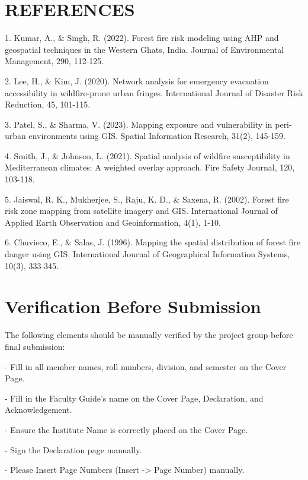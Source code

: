 \documentclass[12pt,a4paper]{article}
\begin{document}
\clearpage
\section*{REFERENCES}

1. Kumar, A., \& Singh, R. (2022). Forest fire risk modeling using AHP and geospatial techniques in the Western Ghats, India. Journal of Environmental Management, 290, 112-125.


2. Lee, H., \& Kim, J. (2020). Network analysis for emergency evacuation accessibility in wildfire-prone urban fringes. International Journal of Disaster Risk Reduction, 45, 101-115.


3. Patel, S., \& Sharma, V. (2023). Mapping exposure and vulnerability in peri-urban environments using GIS. Spatial Information Research, 31(2), 145-159.


4. Smith, J., \& Johnson, L. (2021). Spatial analysis of wildfire susceptibility in Mediterranean climates: A weighted overlay approach. Fire Safety Journal, 120, 103-118.


5. Jaiswal, R. K., Mukherjee, S., Raju, K. D., \& Saxena, R. (2002). Forest fire risk zone mapping from satellite imagery and GIS. International Journal of Applied Earth Observation and Geoinformation, 4(1), 1-10.


6. Chuvieco, E., \& Salas, J. (1996). Mapping the spatial distribution of forest fire danger using GIS. International Journal of Geographical Information Systems, 10(3), 333-345.



\section*{Verification Before Submission}

The following elements should be manually verified by the project group before final submission:


- Fill in all member names, roll numbers, division, and semester on the Cover Page.


- Fill in the Faculty Guide's name on the Cover Page, Declaration, and Acknowledgement.


- Ensure the Institute Name is correctly placed on the Cover Page.


- Sign the Declaration page manually.


- Please Insert Page Numbers (Insert -> Page Number) manually.
\end{document}
